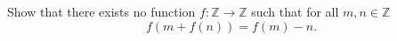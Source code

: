 Show that there exists no function $f\colon\mathbb{Z}\to\mathbb{Z}$ such that for all $m,n \in \mathbb{Z}$
$$f(m+f(n))=f(m)-n.$$
